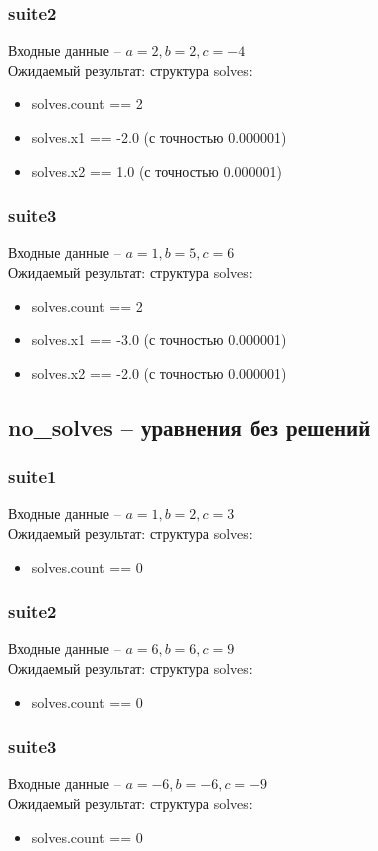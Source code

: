 \documentclass{article}
\begin{document}
\subsubsection{suite2}
Входные данные -- $a=2, b=2, c=-4$\\
Ожидаемый результат: структура solves:
\begin{itemize}
    \item solves.count == 2
    \item solves.x1 == -2.0 (с точностью 0.000001)
    \item solves.x2 == 1.0 (с точностью 0.000001)
\end{itemize}
\subsubsection{suite3}
Входные данные -- $a=1, b=5, c=6$\\
Ожидаемый результат: структура solves:
\begin{itemize}
    \item solves.count == 2
    \item solves.x1 == -3.0 (с точностью 0.000001)
    \item solves.x2 == -2.0 (с точностью 0.000001)
\end{itemize}

\subsection{no\_solves -- уравнения без решений}
\subsubsection{suite1}
Входные данные -- $a=1, b=2, c=3$\\
Ожидаемый результат: структура solves:
\begin{itemize}
    \item solves.count == 0
\end{itemize}
\subsubsection{suite2}
Входные данные -- $a=6, b=6, c=9$\\
Ожидаемый результат: структура solves:
\begin{itemize}
    \item solves.count == 0
\end{itemize}
\subsubsection{suite3}
Входные данные -- $a=-6, b=-6, c=-9$\\
Ожидаемый результат: структура solves:
\begin{itemize}
    \item solves.count == 0
\end{itemize}
\end{document}
